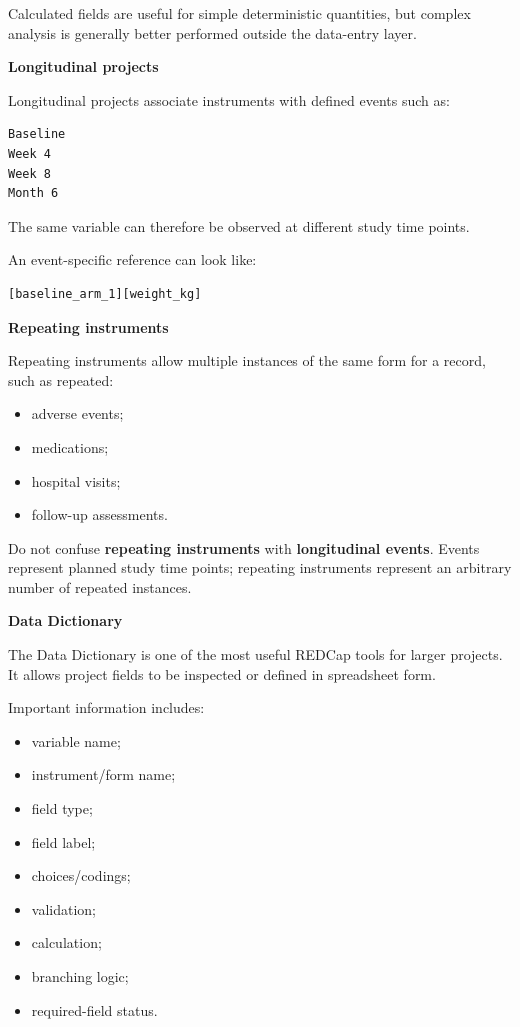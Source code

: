 \documentclass[11pt,letterpaper]{article}
\begin{document}
Calculated fields are useful for simple deterministic quantities, but complex
analysis is generally better performed outside the data-entry layer.

\textbf{Longitudinal projects}

Longitudinal projects associate instruments with defined events such as:

\begin{lstlisting}
Baseline
Week 4
Week 8
Month 6
\end{lstlisting}

The same variable can therefore be observed at different study time points.

An event-specific reference can look like:

\begin{lstlisting}
[baseline_arm_1][weight_kg]
\end{lstlisting}

\textbf{Repeating instruments}

Repeating instruments allow multiple instances of the same form for a record,
such as repeated:

\begin{itemize}[leftmargin=*]
    \item adverse events;
    \item medications;
    \item hospital visits;
    \item follow-up assessments.
\end{itemize}

Do not confuse \textbf{repeating instruments} with \textbf{longitudinal
events}. Events represent planned study time points; repeating instruments
represent an arbitrary number of repeated instances.

\textbf{Data Dictionary}

The Data Dictionary is one of the most useful REDCap tools for larger
projects. It allows project fields to be inspected or defined in spreadsheet
form.

Important information includes:

\begin{itemize}[leftmargin=*]
    \item variable name;
    \item instrument/form name;
    \item field type;
    \item field label;
    \item choices/codings;
    \item validation;
    \item calculation;
    \item branching logic;
    \item required-field status.
\end{itemize}
\end{document}
